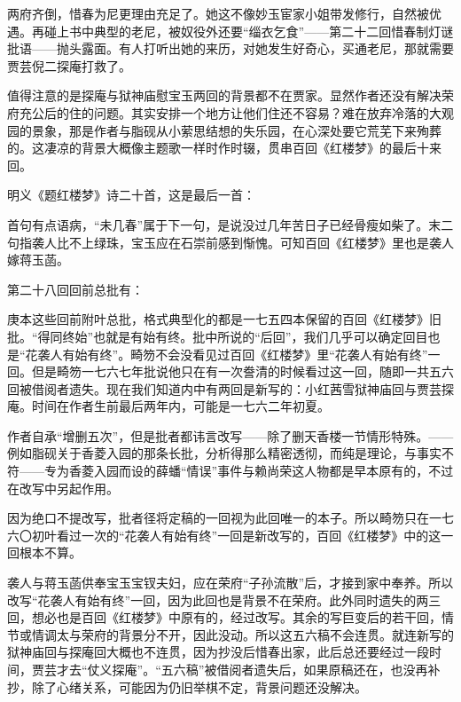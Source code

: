 \par 两府齐倒，惜春为尼更理由充足了。她这不像妙玉宦家小姐带发修行，自然被优遇。再碰上书中典型的老尼，被奴役外还要“缁衣乞食”——第二十二回惜春制灯谜批语——抛头露面。有人打听出她的来历，对她发生好奇心，买通老尼，那就需要贾芸倪二探庵打救了。
\par 值得注意的是探庵与狱神庙慰宝玉两回的背景都不在贾家。显然作者还没有解决荣府充公后的住的问题。其实安排一个地方让他们住还不容易？难在放弃冷落的大观园的景象，那是作者与脂砚从小萦思结想的失乐园，在心深处要它荒芜下来殉葬的。这凄凉的背景大概像主题歌一样时作时辍，贯串百回《红楼梦》的最后十来回。
\par 明义《题红楼梦》诗二十首，这是最后一首：
\par 首句有点语病，“未几春”属于下一句，是说没过几年苦日子已经骨瘦如柴了。末二句指袭人比不上绿珠，宝玉应在石崇前感到惭愧。可知百回《红楼梦》里也是袭人嫁蒋玉菡。
\par 第二十八回回前总批有：
\par 庚本这些回前附叶总批，格式典型化的都是一七五四本保留的百回《红楼梦》旧批。“得同终始”也就是有始有终。批中所说的“后回”，我们几乎可以确定回目也是“花袭人有始有终”。畸笏不会没看见过百回《红楼梦》里“花袭人有始有终”一回。但是畸笏一七六七年批说他只在有一次誊清的时候看过这一回，随即一共五六回被借阅者遗失。现在我们知道内中有两回是新写的：小红茜雪狱神庙回与贾芸探庵。时间在作者生前最后两年内，可能是一七六二年初夏。
\par 作者自承“增删五次”，但是批者都讳言改写——除了删天香楼一节情形特殊。——例如脂砚关于香菱入园的那条长批，分析得那么精密透彻，而纯是理论，与事实不符——专为香菱入园而设的薛蟠“情误”事件与赖尚荣这人物都是早本原有的，不过在改写中另起作用。
\par 因为绝口不提改写，批者径将定稿的一回视为此回唯一的本子。所以畸笏只在一七六〇初叶看过一次的“花袭人有始有终”一回是新改写的，百回《红楼梦》中的这一回根本不算。
\par 袭人与蒋玉菡供奉宝玉宝钗夫妇，应在荣府“子孙流散”后，才接到家中奉养。所以改写“花袭人有始有终”一回，因为此回也是背景不在荣府。此外同时遗失的两三回，想必也是百回《红楼梦》中原有的，经过改写。其余的写巨变后的若干回，情节或情调太与荣府的背景分不开，因此没动。所以这五六稿不会连贯。就连新写的狱神庙回与探庵回大概也不连贯，因为抄没后惜春出家，此后总还要经过一段时间，贾芸才去“仗义探庵”。“五六稿”被借阅者遗失后，如果原稿还在，也没再补抄，除了心绪关系，可能因为仍旧举棋不定，背景问题还没解决。
